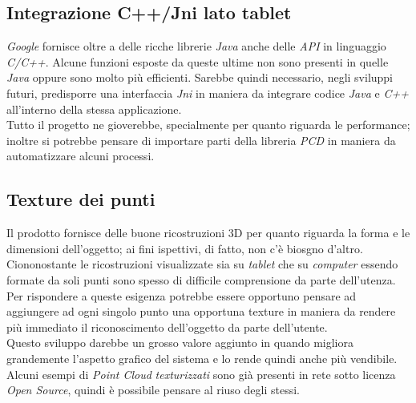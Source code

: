\subsection{Integrazione C++/Jni lato tablet}
\emph{Google} fornisce oltre a delle ricche librerie \emph{Java} anche delle \emph{API} in linguaggio \emph{C/C++}. Alcune funzioni esposte da queste ultime non sono presenti in quelle \emph{Java} oppure sono molto più efficienti. Sarebbe quindi necessario, negli sviluppi futuri, predisporre una interfaccia \emph{Jni} in maniera da integrare codice \emph{Java} e \emph{C++} all'interno della stessa applicazione.\\
Tutto il progetto ne gioverebbe, specialmente per quanto riguarda le performance; inoltre si potrebbe pensare di importare parti della libreria \emph{PCD} in maniera da automatizzare alcuni processi.

\subsection{Texture dei punti}
Il prodotto fornisce delle buone ricostruzioni 3D per quanto riguarda la forma e le dimensioni dell'oggetto; ai fini ispettivi, di fatto, non c'è biosgno d'altro. Ciononostante le ricostruzioni visualizzate sia su \emph{tablet} che su \emph{computer} essendo formate da soli punti sono spesso di difficile comprensione da parte dell'utenza. Per rispondere a queste esigenza potrebbe essere opportuno pensare ad aggiungere ad ogni singolo punto una opportuna texture in maniera da rendere più immediato il riconoscimento dell'oggetto da parte dell'utente.\\
Questo sviluppo darebbe un grosso valore aggiunto in quando migliora grandemente l'aspetto grafico del sistema e lo rende quindi anche più vendibile.\\
Alcuni esempi di \emph{Point Cloud} \emph{texturizzati} sono già presenti in rete sotto licenza \emph{Open Source}, quindi è possibile pensare al riuso degli stessi.

